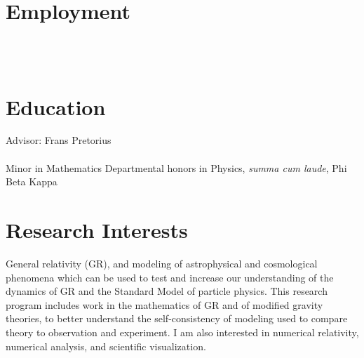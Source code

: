 \documentclass{my_cv}
\begin{document}
\bigskip
{}
\section{Employment}
\noindent
{}
\\ \\
\section{Education}
\noindent
{}
\indentline
   Advisor: Frans Pretorius
\\ \\
\indentline
   Minor in Mathematics
\indentline
   Departmental honors in Physics, \emph{summa cum laude}, Phi Beta Kappa
\section{Research Interests}
	General relativity (GR), and modeling of
astrophysical and cosmological phenomena which can be used
to test and increase our understanding of the dynamics of GR and the 
Standard Model of particle physics.
This research program includes work in
the mathematics of GR and of modified gravity theories, to better understand
the self-consistency of modeling used to compare theory to observation and
experiment.
I am also interested in numerical relativity, numerical analysis, and
scientific visualization.
\end{document}
